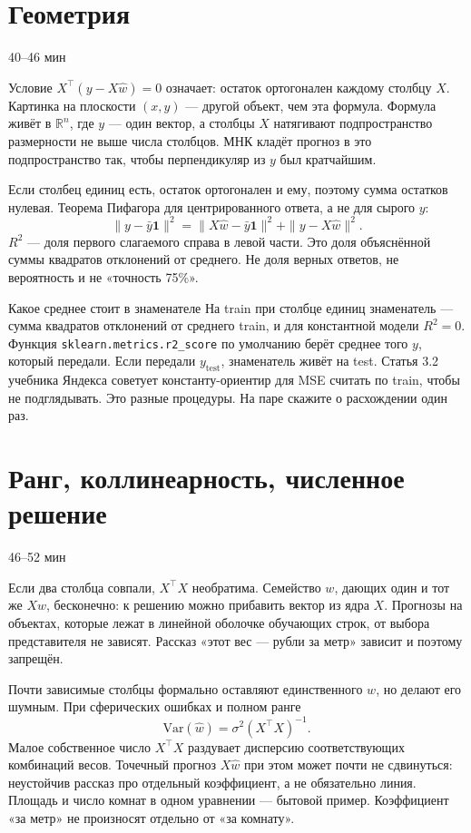 \documentclass[11pt,a4paper]{article}
\newcommand{\timing}[1]{\hfill{\small\color{blue}#1}}
\begin{document}
\section{Геометрия}

\timing{40--46 мин}

Условие \(X^{\top}(y-X\hat w)=0\) означает: остаток ортогонален каждому столбцу \(X\). Картинка на плоскости \((x,y)\) --- другой объект, чем эта формула. Формула живёт в \(\mathbb R^{n}\), где \(y\) --- один вектор, а столбцы \(X\) натягивают подпространство размерности не выше числа столбцов. МНК кладёт прогноз в это подпространство так, чтобы перпендикуляр из \(y\) был кратчайшим.

Если столбец единиц есть, остаток ортогонален и ему, поэтому сумма остатков нулевая. Теорема Пифагора для центрированного ответа, а не для сырого \(y\):
\[
\|y-\bar y\mathbf 1\|^{2}=\|X\hat w-\bar y\mathbf 1\|^{2}+\|y-X\hat w\|^{2}.
\]
\(R^{2}\) --- доля первого слагаемого справа в левой части. Это доля объяснённой суммы квадратов отклонений от среднего. Не доля верных ответов, не вероятность и не «точность 75\%».

\begin{warnbox}{Какое среднее стоит в знаменателе}
На train при столбце единиц знаменатель --- сумма квадратов отклонений от среднего train, и для константной модели \(R^{2}=0\). Функция \texttt{sklearn.metrics.r2\_score} по умолчанию берёт среднее того \(y\), который передали. Если передали \(y_{\mathrm{test}}\), знаменатель живёт на test. Статья 3.2 учебника Яндекса советует константу-ориентир для MSE считать по train, чтобы не подглядывать. Это разные процедуры. На паре скажите о расхождении один раз.
\end{warnbox}

\section{Ранг, коллинеарность, численное решение}

\timing{46--52 мин}

Если два столбца совпали, \(X^{\top}X\) необратима. Семейство \(w\), дающих один и тот же \(Xw\), бесконечно: к решению можно прибавить вектор из ядра \(X\). Прогнозы на объектах, которые лежат в линейной оболочке обучающих строк, от выбора представителя не зависят. Рассказ «этот вес --- рубли за метр» зависит и поэтому запрещён.

Почти зависимые столбцы формально оставляют единственного \(w\), но делают его шумным. При сферических ошибках и полном ранге
\[
\mathrm{Var}(\hat w)=\sigma^{2}(X^{\top}X)^{-1}.
\]
Малое собственное число \(X^{\top}X\) раздувает дисперсию соответствующих комбинаций весов. Точечный прогноз \(X\hat w\) при этом может почти не сдвинуться: неустойчив рассказ про отдельный коэффициент, а не обязательно линия. Площадь и число комнат в одном уравнении --- бытовой пример. Коэффициент «за метр» не произносят отдельно от «за комнату».
\end{document}
